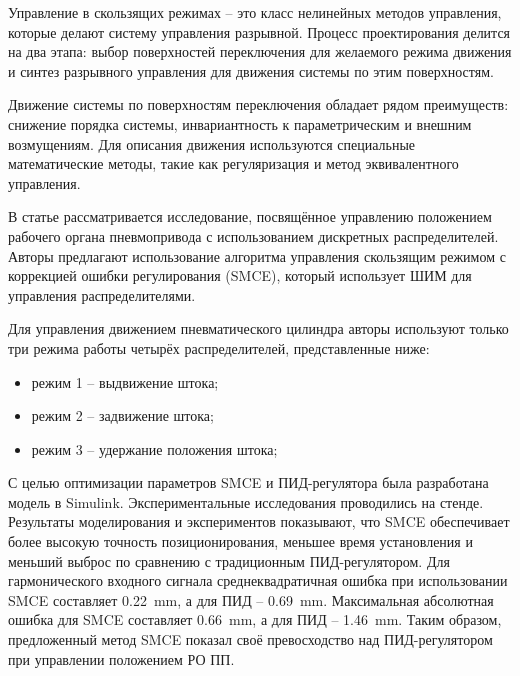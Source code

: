 Управление в скользящих режимах \cite*{utkin2017sliding} -- это класс нелинейных методов управления, которые делают систему управления разрывной.
Процесс проектирования делится на два этапа: выбор поверхностей переключения для желаемого режима движения и синтез разрывного
управления для движения системы по этим поверхностям.

Движение системы по поверхностям переключения обладает рядом преимуществ: снижение порядка системы, инвариантность
к параметрическим и внешним возмущениям. Для описания движения используются специальные математические методы, такие
как регуляризация и метод эквивалентного управления.



В статье \cite*{Elsayed} рассматривается исследование, посвящённое управлению положением рабочего органа пневмопривода
с использованием дискретных распределителей.
Авторы предлагают использование алгоритма управления скользящим режимом с коррекцией ошибки регулирования (SMCE), который использует
ШИМ для управления распределителями.

Для управления движением пневматического цилиндра авторы используют только три режима работы
четырёх распределителей, представленные ниже:
\begin{itemize}
    \item режим 1 -- выдвижение штока;
    \item режим 2 -- задвижение штока;
    \item режим 3 -- удержание положения штока;
\end{itemize}

С целью оптимизации параметров SMCE и ПИД-регулятора была разработана модель в Simulink.
Экспериментальные исследования проводились на стенде. Результаты моделирования и экспериментов
показывают, что SMCE обеспечивает более высокую точность
позиционирования, меньшее время установления и меньший выброс по сравнению с традиционным ПИД-регулятором.
Для гармонического входного сигнала среднеквадратичная ошибка при использовании SMCE составляет \num{0.22}~\si{\milli\metre}, а
для ПИД -- \num{0.69}~\si{\milli\metre}. Максимальная абсолютная ошибка для SMCE составляет \num{0.66}~\si{\milli\metre},
а для ПИД -- \num{1.46}~\si{\milli\metre}. Таким образом,
предложенный метод SMCE показал своё превосходство над ПИД-регулятором при управлении положением РО ПП.

